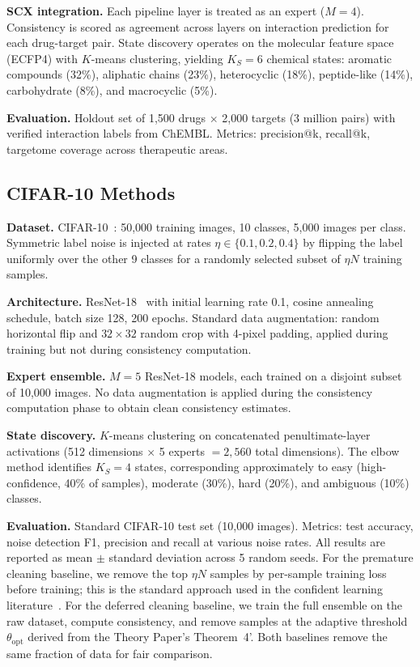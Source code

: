 \documentclass{article}
\begin{document}
\textbf{SCX integration.} Each pipeline layer is treated as an expert ($M = 4$). Consistency is scored as agreement across layers on interaction prediction for each drug-target pair. State discovery operates on the molecular feature space (ECFP4) with $K$-means clustering, yielding $K_S = 6$ chemical states: aromatic compounds (32\%), aliphatic chains (23\%), heterocyclic (18\%), peptide-like (14\%), carbohydrate (8\%), and macrocyclic (5\%).

\textbf{Evaluation.} Holdout set of 1,500 drugs $\times$ 2,000 targets (3 million pairs) with verified interaction labels from ChEMBL. Metrics: precision@k, recall@k, targetome coverage across therapeutic areas.

\subsection{CIFAR-10 Methods}
\label{sec:methods_cifar}

\textbf{Dataset.} CIFAR-10~\cite{krizhevsky2009cifar}: 50,000 training images, 10 classes, 5,000 images per class. Symmetric label noise is injected at rates $\eta \in \{0.1, 0.2, 0.4\}$ by flipping the label uniformly over the other 9 classes for a randomly selected subset of $\eta N$ training samples.

\textbf{Architecture.} ResNet-18~\cite{he2016resnet} with initial learning rate 0.1, cosine annealing schedule, batch size 128, 200 epochs. Standard data augmentation: random horizontal flip and $32 \times 32$ random crop with 4-pixel padding, applied during training but not during consistency computation.

\textbf{Expert ensemble.} $M = 5$ ResNet-18 models, each trained on a disjoint subset of 10,000 images. No data augmentation is applied during the consistency computation phase to obtain clean consistency estimates.

\textbf{State discovery.} $K$-means clustering on concatenated penultimate-layer activations (512 dimensions $\times$ 5 experts $= 2,560$ total dimensions). The elbow method identifies $K_S = 4$ states, corresponding approximately to easy (high-confidence, 40\% of samples), moderate (30\%), hard (20\%), and ambiguous (10\%) classes.

\textbf{Evaluation.} Standard CIFAR-10 test set (10,000 images). Metrics: test accuracy, noise detection F1, precision and recall at various noise rates. All results are reported as mean $\pm$ standard deviation across 5 random seeds. For the premature cleaning baseline, we remove the top $\eta N$ samples by per-sample training loss before training; this is the standard approach used in the confident learning literature~\cite{northcutt2021confident}. For the deferred cleaning baseline, we train the full ensemble on the raw dataset, compute consistency, and remove samples at the adaptive threshold $\theta_{\text{opt}}$ derived from the Theory Paper's Theorem~4'. Both baselines remove the same fraction of data for fair comparison.
\end{document}

